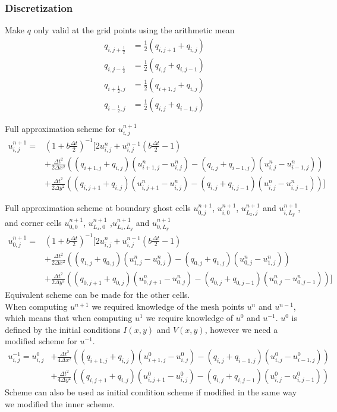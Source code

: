 \documentclass[11pt]{article}
\begin{document}
		\subsubsection*{Discretization}
		Make $q$ only valid at the grid points using the arithmetic mean
		\begin{align*}
		q_{i,j+\frac{1}{2}} &= \frac{1}{2}(q_{i,j+1} + q_{i,j}) \\
		q_{i,j-\frac{1}{2}} &= \frac{1}{2}(q_{i,j} + q_{i,j-1}) \\
		q_{i+\frac{1}{2},j} &= \frac{1}{2}(q_{i+1,j} + q_{i,j}) \\
		q_{i-\frac{1}{2},j} &= \frac{1}{2}(q_{i,j} + q_{i-1,j}) 
		\end{align*}
		
		Full approximation scheme for $u^{n+1}_{i,j}$
		\begin{align*}
		u^{n+1}_{i,j} = & \left(1 + b\frac{\Delta t}{2}\right)^{-1} 
		\biggl[2u^{n}_{i,j}+u^{n-1}_{i,j}\left(b\frac{\Delta t}{2}-1\right) \\
		& +\frac{\Delta t^2}{2\Delta x^2}((q_{i+1,j} + q_{i,j})
		(u^n_{i+1,j}-u^n_{i,j})-(q_{i,j} + q_{i-1,j})
		(u^n_{i,j}-u^n_{i-1,j})) \\
		& +\frac{\Delta t^2}{2\Delta y^2}((q_{i,j+1} + q_{i,j})
		(u^n_{i,j+1}-u^n_{i,j})-(q_{i,j} + q_{i,j-1})
		(u^n_{i,j}-u^n_{i,j-1})) \biggr]
		\end{align*}
		
		Full approximation scheme at boundary ghost cells 
		$u^{n+1}_{0,j}$, $u^{n+1}_{i,0}$, $u^{n+1}_{L_x,j}$ and 
		$u^{n+1}_{i,L_y}$, and corner cells $u^{n+1}_{0,0}$, $u^{n+1}_{L_x,0}$
		,$u^{n+1}_{L_x,L_y}$ and $u^{n+1}_{0,L_y}$
		\begin{align*}
		u^{n+1}_{0,j} = & \left(1 + b\frac{\Delta t}{2}\right)^{-1} 
		\biggl[2u^{n}_{i,j}+u^{n-1}_{i,j}\left(b\frac{\Delta t}{2}-1\right) \\
		& +\frac{\Delta t^2}{2\Delta x^2}((q_{1,j} + q_{0,j})
		(u^n_{1,j}-u^n_{0,j})-(q_{0,j} + q_{1,j})
		(u^n_{0,j}-u^n_{1,j})) \\
		& +\frac{\Delta t^2}{2\Delta y^2}((q_{0,j+1} + q_{0,j})
		(u^n_{0,j+1}-u^n_{0,j})-(q_{0,j} + q_{0,j-1})
		(u^n_{0,j}-u^n_{0,j-1})) \biggr]
		\end{align*}
		Equivalent scheme can be made for the other cells.\\
		When computing $u^{n+1}$ we required knowledge of the mesh points
		$u^{n}$ and $u^{n-1}$, which means that when computing $u^{1}$ 
		we require knowledge of $u^{0}$ and $u^{-1}$. $u^{0}$ is defined 
		by the initial conditions $I(x,y)$ and $V(x,y)$, however
		we need a modified scheme for $u^{-1}$.
		\begin{align*}
		u^{-1}_{i,j} = u^{0}_{i,j}
		& +\frac{\Delta t^2}{4\Delta x^2}((q_{i+1,j} + q_{i,j})
		(u^0_{i+1,j}-u^0_{i,j})-(q_{i,j} + q_{i-1,j})
		(u^0_{i,j}-u^0_{i-1,j})) \\
		& +\frac{\Delta t^2}{4\Delta y^2}((q_{i,j+1} + q_{i,j})
		(u^0_{i,j+1}-u^0_{i,j})-(q_{i,j} + q_{i,j-1})
		(u^0_{i,j}-u^0_{i,j-1}))
		\end{align*}
		Scheme can also be used as initial condition scheme if modified
		in the same way we modified the inner scheme.
		
\end{document}
